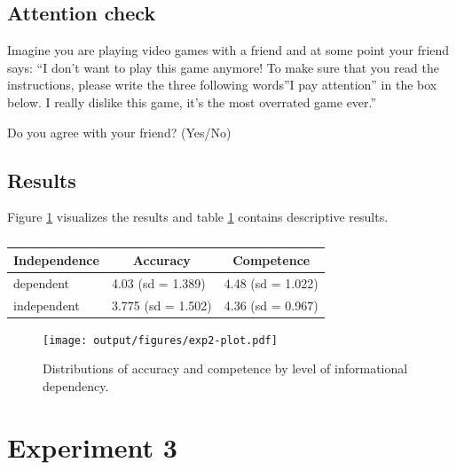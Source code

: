 \documentclass[
  doc,floatsintext]{apa6}
\begin{document}
\subsection{Attention check}\label{attention-check-1}

Imagine you are playing video games with a friend and at some point your friend says: ``I don't want to play this game anymore! To make sure that you read the instructions, please write the three following words''I pay attention'' in the box below. I really dislike this game, it's the most overrated game ever.''

Do you agree with your friend? (Yes/No)

\subsection{Results}\label{results-1}

Figure \ref{fig:exp2-plot} visualizes the results and table \ref{tab:exp2-table} contains descriptive results.

\begin{table}[tbp]

\begin{center}
\begin{threeparttable}

\caption{\label{tab:exp2-table}}

\begin{tabular}{lll}
\toprule
Independence & \multicolumn{1}{c}{Accuracy} & \multicolumn{1}{c}{Competence}\\
\midrule
dependent & 4.03 (sd = 1.389) & 4.48 (sd = 1.022)\\
independent & 3.775 (sd = 1.502) & 4.36 (sd = 0.967)\\
\bottomrule
\end{tabular}

\end{threeparttable}
\end{center}

\end{table}



\begin{figure}
\centering
\texttt{[image: output/figures/exp2-plot.pdf]}
\caption{\label{fig:exp2-plot}Distributions of accuracy and competence by level of informational dependency.}
\end{figure}

\clearpage

\section{Experiment 3}\label{exp3}
\end{document}
